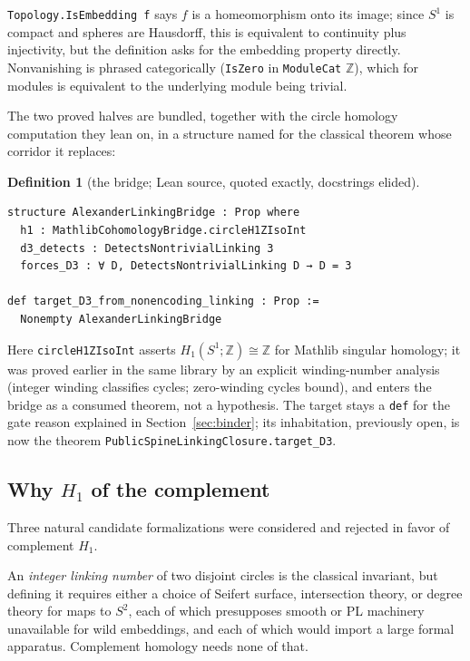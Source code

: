 \documentclass[11pt]{article}
\theoremstyle{definition}
\newtheorem{definition}[theorem]{Definition}
\newcommand{\Z}{\mathbb{Z}}
\newcommand{\lean}[1]{\texttt{#1}}
\begin{document}
\lean{Topology.IsEmbedding f} says $f$ is a homeomorphism onto its image; since $S^1$ is compact and spheres are Hausdorff, this is equivalent to continuity plus injectivity, but the definition asks for the embedding property directly. Nonvanishing is phrased categorically (\lean{IsZero} in \lean{ModuleCat} $\Z$), which for modules is equivalent to the underlying module being trivial.

The two proved halves are bundled, together with the circle homology computation they lean on, in a structure named for the classical theorem whose corridor it replaces:

\begin{definition}[the bridge; Lean source, quoted exactly, docstrings elided]
\label{def:bridge-lean}
\begin{lstlisting}
structure AlexanderLinkingBridge : Prop where
  h1 : MathlibCohomologyBridge.circleH1ZIsoInt
  d3_detects : DetectsNontrivialLinking 3
  forces_D3 : ∀ D, DetectsNontrivialLinking D → D = 3

def target_D3_from_nonencoding_linking : Prop :=
  Nonempty AlexanderLinkingBridge
\end{lstlisting}
\end{definition}

Here \lean{circleH1ZIsoInt} asserts $H_1(S^1;\Z) \cong \Z$ for Mathlib singular homology; it was proved earlier in the same library by an explicit winding-number analysis (integer winding classifies cycles; zero-winding cycles bound), and enters the bridge as a consumed theorem, not a hypothesis. The target stays a \lean{def} for the gate reason explained in Section~\ref{sec:binder}; its inhabitation, previously open, is now the theorem \lean{PublicSpineLinkingClosure.target\_D3}.

\subsection{Why $H_1$ of the complement}

Three natural candidate formalizations were considered and rejected in favor of complement $H_1$.

An \emph{integer linking number} of two disjoint circles is the classical invariant, but defining it requires either a choice of Seifert surface, intersection theory, or degree theory for maps to $S^2$, each of which presupposes smooth or PL machinery unavailable for wild embeddings, and each of which would import a large formal apparatus. Complement homology needs none of that.
\end{document}
